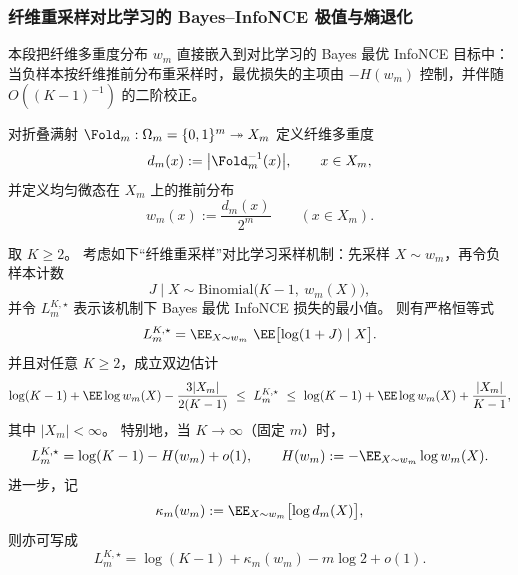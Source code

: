 \subsubsection{纤维重采样对比学习的 Bayes--InfoNCE 极值与熵退化}\label{subsubsec:fold-infonce-fiber-resampling}
本段把纤维多重度分布 \(w_m\) 直接嵌入到对比学习的 Bayes 最优 InfoNCE 目标中：当负样本按纤维推前分布重采样时，最优损失的主项由 \(-H(w_m)\) 控制，并伴随 \(O((K-1)^{-1})\) 的二阶校正。

\begin{definition}[纤维推前分布]\label{def:fold-pushforward-weight-wm}
对折叠满射 \(\Fold_m:\Omega_m=\{0,1\}^m\twoheadrightarrow X_m\) 定义纤维多重度
\[
d_m(x):=\bigl|\Fold_m^{-1}(x)\bigr|,\qquad x\in X_m,
\]
并定义均匀微态在 \(X_m\) 上的推前分布
\[
w_m(x):=\frac{d_m(x)}{2^m}\qquad(x\in X_m).
\]
\end{definition}

\begin{theorem}\label{thm:fold-infonce-entropy-degeneration-second-order}
取 \(K\ge 2\)。
考虑如下“纤维重采样”对比学习采样机制：先采样
\(
X\sim w_m
\)，再令负样本计数
\[
J\mid X\sim \mathrm{Binomial}\bigl(K-1,\ w_m(X)\bigr),
\]
并令 \(L_{m}^{K,\star}\) 表示该机制下 Bayes 最优 InfoNCE 损失的最小值。
则有严格恒等式
\[
L_{m}^{K,\star}
=\EE_{X\sim w_m}\ \EE\bigl[\log(1+J)\mid X\bigr].
\]
并且对任意 \(K\ge 2\)，成立双边估计
\[
\log(K-1)+\EE\log w_m(X)-\frac{3|X_m|}{2(K-1)}
\ \le\
L_{m}^{K,\star}
\ \le\
\log(K-1)+\EE\log w_m(X)+\frac{|X_m|}{K-1},
\]
其中 \(|X_m|<\infty\)。
特别地，当 \(K\to\infty\)（固定 \(m\)）时，
\[
L_{m}^{K,\star}
=\log(K-1)-H(w_m)+o(1),
\qquad
H(w_m):=-\EE_{X\sim w_m}\log w_m(X).
\]
进一步，记
\[
\kappa_m(w_m):=\EE_{X\sim w_m}\bigl[\log d_m(X)\bigr],
\]
则亦可写成
\[
L_{m}^{K,\star}
=\log(K-1)+\kappa_m(w_m)-m\log 2+o(1).
\]
\end{theorem}

